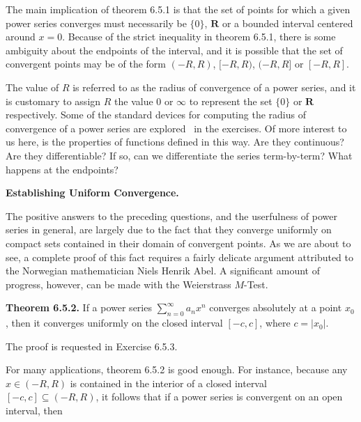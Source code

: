 \documentclass[10pt]{article}
\begin{document}
The main implication of theorem 6.5.1 is that the set of points for which a given power series converges must necessarily be $\displaystyle \{0\}$, $\displaystyle \mathbf{R}$ or a bounded interval centered around $\displaystyle x=0$. Because of the strict inequality in theorem 6.5.1, there is some ambiguity about the endpoints of the interval, and it is possible that the set of convergent points may be of the form $\displaystyle ( -R,R)$, $\displaystyle [ -R,R)$, $\displaystyle ( -R,R]$ or $\displaystyle [ -R,R]$.



The value of $\displaystyle R$ is referred to as the radius of convergence of a power series, and it is customary to assign $\displaystyle R$ the value $\displaystyle 0$ or $\displaystyle \infty $ to represent the set $\displaystyle \{0\}$ or $\displaystyle \mathbf{R}$ respectively. Some of the standard devices for computing the radius of convergence of a power series are explored \ in the exercises. Of more interest to us here, is the properties of functions defined in this way. Are they continuous? Are they differentiable? If so, can we differentiate the series term-by-term? What happens at the endpoints?



\textbf{Establishing Uniform Convergence.}



The positive answers to the preceding questions, and the userfulness of power series in general, are largely due to the fact that they converge uniformly on compact sets contained in their domain of convergent points. As we are about to see, a complete proof of this fact requires a fairly delicate argument attributed to the Norwegian mathematician Niels Henrik Abel. A significant amount of progress, however, can be made with the Weierstrass $\displaystyle M$-Test. 



\textbf{Theorem 6.5.2.} If a power series $\displaystyle \sum _{n=0}^{\infty } a_{n} x^{n}$ converges absolutely at a point $\displaystyle x_{0}$, then it converges uniformly on the closed interval $\displaystyle [ -c,c]$, where $\displaystyle c=|x_{0} |$. 



The proof is requested in Exercise 6.5.3.



For many applications, theorem 6.5.2 is good enough. For instance, because any $\displaystyle x\in ( -R,R)$ is contained in the interior of a closed interval $\displaystyle [ -c,c] \subseteq ( -R,R)$, it follows that if a power series is convergent on an open interval, then
\end{document}
